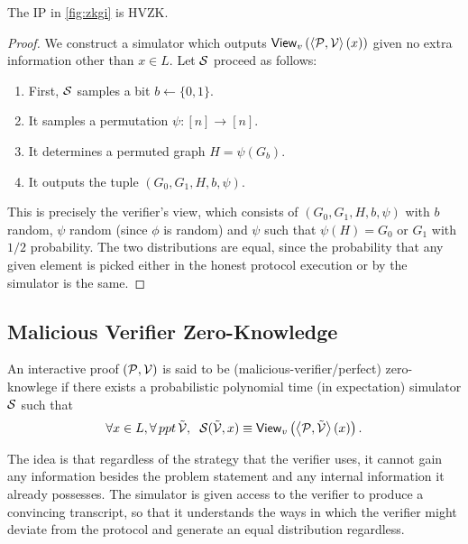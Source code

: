 \begin{theorem}
	The IP in \ref{fig:zkgi} is HVZK.
	\label{thm:gihvzk}
\end{theorem}
\begin{proof}
	We construct a simulator which outputs $\mathsf{View}_v\left(\left\langle\mathcal{P},\mathcal{V}\right\rangle(x)\right)$ given no extra information other than $x\in L$. Let $\mathcal{S}$ proceed as follows:
	\begin{enumerate}
		\item First, $\mathcal{S}$ samples a bit $b\leftarrow\{0,1\}.$
		\item It samples a permutation $\psi:[n]\rightarrow[n]$.
		\item It determines a permuted graph $H=\psi(G_b)$.
		\item It outputs the tuple $(G_0, G_1, H, b,\psi)$.
	\end{enumerate} 
	This is precisely the verifier's view, which consists of $(G_0, G_1, H, b, \psi)$ with $b$ random, $\psi$ random (since $\phi$ is random) and $\psi$ such that $\psi(H)=G_0$ or $G_1$ with $1/2$ probability. The two distributions are equal, since the probability that any given element is picked either in the honest protocol execution or by the simulator is the same.
\end{proof}

\subsection{Malicious Verifier Zero-Knowledge}

\begin{definition}
	An interactive proof $(\mathcal{P},\mathcal{V})$ is said to be (malicious-verifier/perfect) zero-knowlege if there exists a probabilistic polynomial time (in expectation) simulator $\mathcal{S}$ such that
	$$\forall x\in L, \forall\, ppt\,\tilde{\mathcal{V}}, \hspace{2mm} \mathcal{S}(\tilde{\mathcal{V}}, x)\equiv\mathsf{View}_v\left(\left\langle\mathcal{P},\tilde{\mathcal{V}}\right\rangle(x)\right).$$
\end{definition}

The idea is that regardless of the strategy that the verifier uses, it cannot gain any information besides the problem statement and any internal information it already possesses. The simulator is given access to the verifier to produce a convincing transcript, so that it understands the ways in which the verifier might deviate from the protocol and generate an equal distribution regardless.

